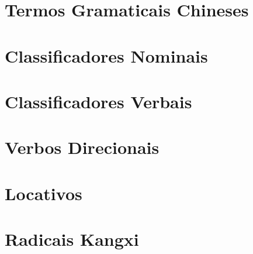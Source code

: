 \documentclass[a4paper,9pt,twoside,openright,book]{memoir}
\begin{document}
\onecolumn

\clearpage
\pagestyle{plain}
\chapter{Termos Gramaticais Chineses}


\clearpage
\pagestyle{plain}
\chapter{Classificadores Nominais}


\clearpage
\pagestyle{plain}
\chapter{Classificadores Verbais}


\clearpage
\pagestyle{plain}
\chapter{Verbos Direcionais}


\clearpage
\pagestyle{plain}
\chapter{Locativos}


\clearpage
\pagestyle{plain}
\chapter{Radicais Kangxi}

\end{document}
